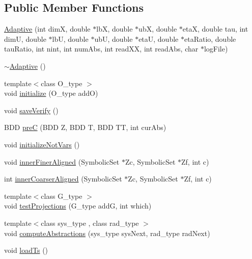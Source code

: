 \subsection*{Public Member Functions}
\begin{DoxyCompactItemize}
\item 
\hyperlink{classscots_1_1Adaptive_a5665d4b8db7cc7c1e1ecba0a512959d7}{Adaptive} (int dimX, double $\ast$lbX, double $\ast$ubX, double $\ast$etaX, double tau, int dimU, double $\ast$lbU, double $\ast$ubU, double $\ast$etaU, double $\ast$eta\+Ratio, double tau\+Ratio, int nint, int num\+Abs, int read\+XX, int read\+Abs, char $\ast$log\+File)
\item 
\hyperlink{classscots_1_1Adaptive_aa20062d309691c2858912bc3fd9616e7}{$\sim$\+Adaptive} ()
\item 
{\footnotesize template$<$class O\+\_\+type $>$ }\\void \hyperlink{classscots_1_1Adaptive_acad37a2f5296206da9c7ab2b82e622fd}{initialize} (O\+\_\+type addO)
\item 
void \hyperlink{classscots_1_1Adaptive_ab1d6eeb4c4b6ec88e7e6a283a7dfd57d}{save\+Verify} ()
\item 
B\+DD \hyperlink{classscots_1_1Adaptive_aa12a6d24ae6d46011215c2008181bbd2}{preC} (B\+DD Z, B\+DD T, B\+DD TT, int cur\+Abs)
\item 
void \hyperlink{classscots_1_1Adaptive_a6a9af6f25e8c4015ceb24d704da26972}{initialize\+Not\+Vars} ()
\item 
void \hyperlink{classscots_1_1Adaptive_af4c5423a62b8c11110d0a2bdcc96d4fb}{inner\+Finer\+Aligned} (Symbolic\+Set $\ast$Zc, Symbolic\+Set $\ast$Zf, int c)
\item 
int \hyperlink{classscots_1_1Adaptive_a01f8f69d290f9c81f76f6ab44d9ef193}{inner\+Coarser\+Aligned} (Symbolic\+Set $\ast$Zc, Symbolic\+Set $\ast$Zf, int c)
\item 
{\footnotesize template$<$class G\+\_\+type $>$ }\\void \hyperlink{classscots_1_1Adaptive_a9a715bff15ed2365485cca7818c71479}{test\+Projections} (G\+\_\+type addG, int which)
\item 
{\footnotesize template$<$class sys\+\_\+type , class rad\+\_\+type $>$ }\\void \hyperlink{classscots_1_1Adaptive_af6aeb2170e7223c1396454ab2b83fb09}{compute\+Abstractions} (sys\+\_\+type sys\+Next, rad\+\_\+type rad\+Next)
\item 
void \hyperlink{classscots_1_1Adaptive_a111bfb2d3fd8eb0a3871da715985d534}{load\+Ts} ()
\item 

\end{DoxyCompactItemize}
